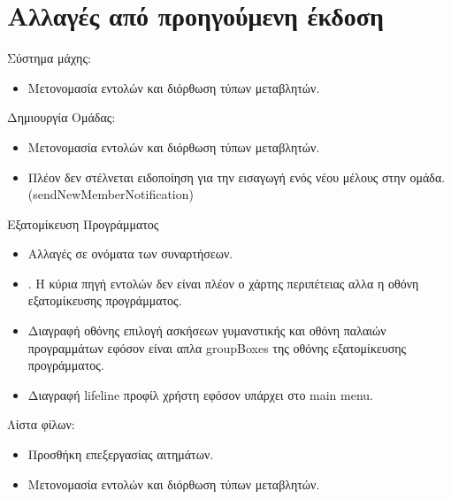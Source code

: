 \section*{Αλλαγές από προηγούμενη έκδοση}





Σύστημα μάχης:
\begin{itemize}
\item Μετονομασία εντολών και διόρθωση τύπων μεταβλητών.
\end{itemize}

Δημιουργία Ομάδας:
\begin{itemize}
\item Μετονομασία εντολών και διόρθωση τύπων μεταβλητών.
\item Πλέον δεν στέλνεται ειδοποίηση για την εισαγωγή ενός νέου μέλους στην ομάδα. (sendNewMemberNotification)
\end{itemize}

Εξατομίκευση Προγράμματος
\begin{itemize}
\item Αλλαγές σε ονόματα των συναρτήσεων.
\item. Η κύρια πηγή εντολών δεν είναι πλέον ο χάρτης περιπέτειας αλλα η οθόνη εξατομίκευσης προγράμματος.
\item Διαγραφή οθόνης επιλογή ασκήσεων γυμανστικής και οθόνη παλαιών προγραμμάτων εφόσον είναι απλα groupBoxes της οθόνης εξατομίκευσης προγράμματος.
\item Διαγραφή lifeline προφίλ χρήστη εφόσον υπάρχει στο main menu.
\end{itemize}

Λίστα φίλων:
\begin{itemize}
\item Προσθήκη επεξεργασίας αιτημάτων.

\item Μετονομασία εντολών και διόρθωση τύπων μεταβλητών.
\end{itemize}

\clearpage